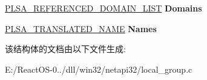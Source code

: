 \begin{DoxyCompactItemize}
\item 
\mbox{\label{struct___m_e_m_b_e_r___e_n_u_m___c_o_n_t_e_x_t_a0185ef95da0d9749021ba950a96008f9}} 
\hyperlink{struct___l_s_a___r_e_f_e_r_e_n_c_e_d___d_o_m_a_i_n___l_i_s_t}{P\+L\+S\+A\+\_\+\+R\+E\+F\+E\+R\+E\+N\+C\+E\+D\+\_\+\+D\+O\+M\+A\+I\+N\+\_\+\+L\+I\+ST} {\bfseries Domains}
\item 
\mbox{\label{struct___m_e_m_b_e_r___e_n_u_m___c_o_n_t_e_x_t_af63ba45c56c357e56091089a67867da2}} 
\hyperlink{struct___l_s_a___t_r_a_n_s_l_a_t_e_d___n_a_m_e}{P\+L\+S\+A\+\_\+\+T\+R\+A\+N\+S\+L\+A\+T\+E\+D\+\_\+\+N\+A\+ME} {\bfseries Names}
\end{DoxyCompactItemize}


该结构体的文档由以下文件生成\+:\begin{DoxyCompactItemize}
\item 
E\+:/\+React\+O\+S-\/0../dll/win32/netapi32/local\+\_\+group.\+c\end{DoxyCompactItemize}
